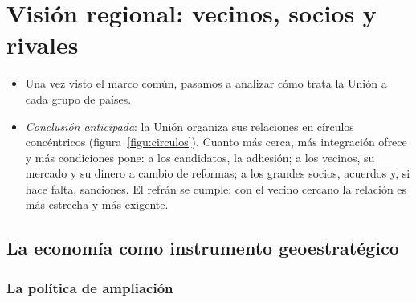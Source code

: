 \documentclass[11pt]{article}
\begin{document}
\section{Visión regional: vecinos, socios y rivales}\label{sec:regional}

\begin{itemize}
\item Una vez visto el marco común, pasamos a analizar cómo trata la Unión a cada grupo de países.
\item \emph{Conclusión anticipada}: la Unión organiza sus relaciones en círculos concéntricos (figura~\ref{figu:circulos}). Cuanto más cerca, más integración ofrece y más condiciones pone: a los candidatos, la adhesión; a los vecinos, su mercado y su dinero a cambio de reformas; a los grandes socios, acuerdos y, si hace falta, sanciones. El refrán se cumple: con el vecino cercano la relación es más estrecha y más exigente.
\end{itemize}

\begin{infografia}[H]
\centering
\caption{Los círculos de las relaciones exteriores de la Unión}\label{figu:circulos}
\end{infografia}


\subsection{La economía como instrumento geoestratégico}\label{sec:geoestrategico}

\subsubsection{La política de ampliación}\label{sec:ampliacion}
\end{document}
